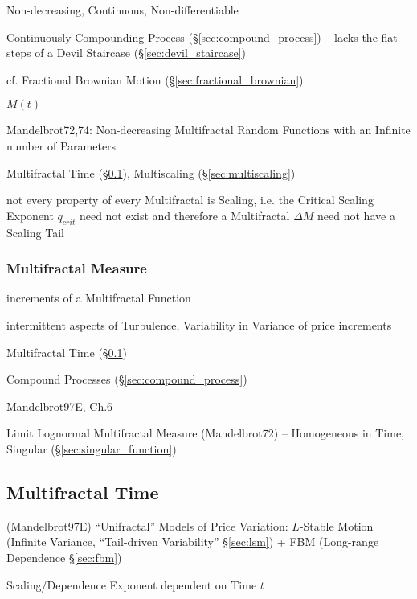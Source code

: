 Non-decreasing, Continuous, Non-differentiable

Continuously Compounding Process (\S\ref{sec:compound_process})
-- lacks the flat steps of a Devil Staircase (\S\ref{sec:devil_staircase})

cf. Fractional Brownian Motion (\S\ref{sec:fractional_brownian})

$M(t)$

Mandelbrot72,74: Non-decreasing Multifractal Random Functions with an Infinite
number of Parameters

Multifractal Time (\S\ref{sec:multifractal_time}), Multiscaling
(\S\ref{sec:multiscaling})

not every property of every Multifractal is Scaling, i.e. the Critical Scaling
Exponent $q_{crit}$ need not exist and therefore a Multifractal $\Delta M$ need
not have a Scaling Tail



\subsubsection{Multifractal Measure}\label{sec:multifractal_measure}

increments of a Multifractal Function

intermittent aspects of Turbulence, Variability in Variance of price increments

Multifractal Time (\S\ref{sec:multifractal_time})

Compound Processes (\S\ref{sec:compound_process})

Mandelbrot97E, Ch.6

Limit Lognormal Multifractal Measure (Mandelbrot72) -- Homogeneous in Time,
Singular (\S\ref{sec:singular_function})



\subsection{Multifractal Time}\label{sec:multifractal_time}

(Mandelbrot97E) ``Unifractal'' Models of Price Variation: $L$-Stable Motion
(Infinite Variance, ``Tail-driven Variability'' \S\ref{sec:lsm}) + FBM
(Long-range Dependence \S\ref{sec:fbm})

Scaling/Dependence Exponent dependent on Time $t$

